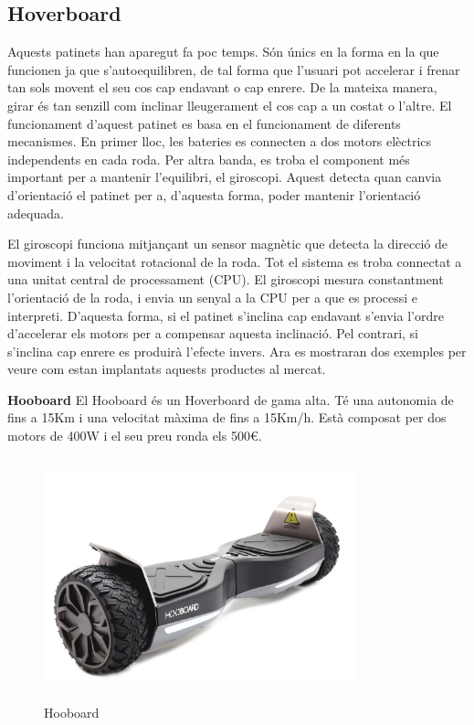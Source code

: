 
\subsection{Hoverboard}
Aquests patinets han aparegut fa poc temps. Són únics en la forma en la que funcionen ja que s'autoequilibren, de tal forma que l'usuari pot accelerar i frenar tan sols movent el seu cos cap endavant o cap enrere. De la mateixa manera, girar és tan senzill com inclinar lleugerament el cos cap a un costat o l'altre. El funcionament d'aquest patinet es basa en el funcionament de diferents mecanismes. En primer lloc, les bateries es connecten a dos motors elèctrics independents en cada roda. Per altra banda, es troba el component més important per a mantenir l'equilibri, el giroscopi. Aquest detecta quan canvia d'orientació el patinet per a, d'aquesta forma, poder mantenir l'orientació adequada. 

El giroscopi funciona mitjançant un sensor magnètic que detecta la direcció de moviment i la velocitat rotacional de la roda. 
Tot el sistema es troba connectat a una unitat central de processament (CPU). El giroscopi mesura constantment l'orientació de la roda, i envia un senyal a la CPU per a que es processi e interpreti. D'aquesta forma, si el patinet s'inclina cap endavant s'envia l'ordre d'accelerar els motors per a compensar aquesta inclinació. Pel contrari, si s'inclina cap enrere es produirà l'efecte invers. Ara es mostraran dos exemples per veure com estan implantats aquests productes al mercat. \newline \bigskip

\textbf{Hooboard} \bigskip \newline  
El Hooboard és un Hoverboard de gama alta. Té una autonomia de fins a 15Km i una velocitat màxima de fins a 15Km/h. Està composat per dos motors de 400W i el seu preu ronda els 500€.
\begin{figure}[H]
		\centering
    	\includegraphics[width=9cm, height=7cm]{Marcteoric/hooboard.jpg}
     	\caption{Hooboard}
\end{figure}


